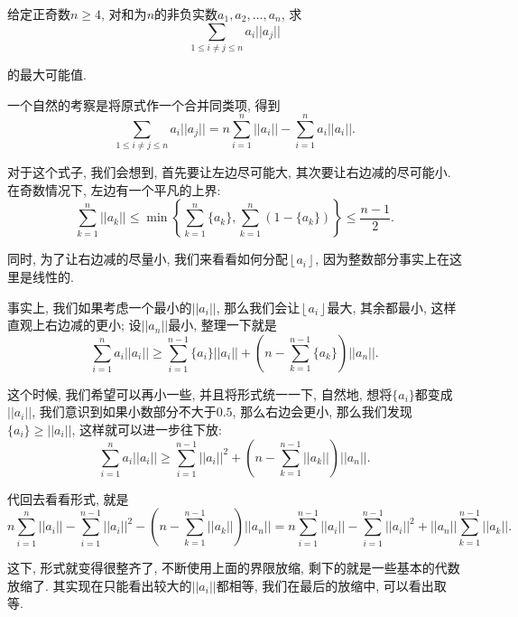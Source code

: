 \documentclass[lang=cn,12pt,thmcnt=section]{elegantbook}
\newcommand{\fl}[1]{\left\lfloor #1\right\rfloor}
\begin{document}
\begin{example}
给定正奇数$n\ge 4$, 对和为$n$的非负实数$a_1,a_2,\dots{},a_n$, 求
\[
\sum_{1\le i\ne j\le n}a_i||a_j||
\]

的最大可能值.
\end{example}

\begin{analysis}
一个自然的考察是将原式作一个合并同类项, 得到
\[
\sum_{1\le i\ne j\le n}a_i||a_j||=n\sum_{i=1}^n ||a_i||-\sum_{i=1}^n a_i||a_i||.
\]

对于这个式子, 我们会想到, 首先要让左边尽可能大, 其次要让右边减的尽可能小. 在奇数情况下, 左边有一个平凡的上界: 
\[
\sum_{k=1}^n ||a_k||\le \min\left\{\sum_{k=1}^n \{a_k\},\sum_{k=1}^n (1-\{a_k\})\right\}\le \frac{n-1}{2}.
\]

同时, 为了让右边减的尽量小, 我们来看看如何分配$\fl{a_i}$, 因为整数部分事实上在这里是线性的. 

事实上, 我们如果考虑一个最小的$||a_i||$, 那么我们会让$\fl{a_i}$最大, 其余都最小, 这样直观上右边减的更小; 设$||a_n||$最小, 整理一下就是
\[
\sum_{i=1}^n a_i||a_i||\ge \sum_{i=1}^{n-1} \{a_i\}||a_i||+\left(n-\sum_{k=1}^{n-1} \{a_k\}\right)||a_n||.
\]

这个时候, 我们希望可以再小一些, 并且将形式统一一下, 自然地, 想将$\{a_i\}$都变成$||a_i||$, 我们意识到如果小数部分不大于$0.5$, 那么右边会更小, 那么我们发现$\{a_i\}\ge ||a_i||$, 这样就可以进一步往下放: 
\[
\sum_{i=1}^n a_i||a_i||\ge \sum_{i=1}^{n-1} ||a_i||^2+\left(n-\sum_{k=1}^{n-1} ||a_k||\right)||a_n||.
\]

代回去看看形式, 就是
\[
n\sum_{i=1}^n ||a_i||-\sum_{i=1}^{n-1} ||a_i||^2-\left(n-\sum_{k=1}^{n-1} ||a_k||\right)||a_n||=n\sum_{i=1}^{n-1} ||a_i||-\sum_{i=1}^{n-1} ||a_i||^2+||a_n||\sum_{k=1}^{n-1} ||a_k||.
\]

这下, 形式就变得很整齐了, 不断使用上面的界限放缩, 剩下的就是一些基本的代数放缩了. 其实现在只能看出较大的$||a_i||$都相等, 我们在最后的放缩中, 可以看出取等. 
\end{analysis}
\end{document}
